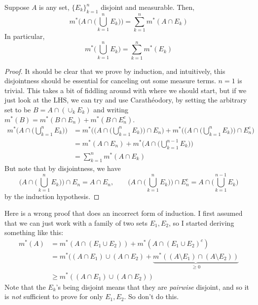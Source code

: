   \begin{lemma}
    Suppose $A$ is any set, $\{E_k\}_{k=1}^n$ disjoint and measurable. Then, 
    \begin{equation}
      m^\ast \bigg( A \cap \Big( \bigcup_{k=1}^n E_k \Big) \bigg) = \sum_{k=1}^n m^\ast (A \cap E_k)
    \end{equation}
    In particular, 
    \begin{equation}
      m^\ast \bigg( \bigcup_{k=1}^n E_k \bigg) = \sum_{k=1}^n m^\ast (E_k)
    \end{equation}
  \end{lemma}
  \begin{proof}
    It should be clear that we prove by induction, and intuitively, this disjointness should be essential for canceling out some measure terms. $n = 1$ is trivial. This takes a bit of fiddling around with where we should start, but if we just look at the LHS, we can try and use Carathéodory, by setting the arbitrary set to be $B = A \cap (\cup_{k} E_k)$ and  writing $m^\ast (B) = m^\ast(B \cap E_n) + m^\ast(B \cap E_n^c)$. 
    \begin{align}
      m^\ast \bigg( A \cap \Big( \bigcup_{k=1}^n E_k \Big) \bigg) 
        & = m^\ast \Bigg( \bigg( A \cap \Big( \bigcup_{k=1}^n E_k \Big) \bigg) \cap E_n \Bigg) + m^\ast \Bigg( \bigg( A \cap \Big( \bigcup_{k=1}^n E_k \Big) \bigg) \cap E_n^c \Bigg) \\  
        & = m^\ast (A \cap E_n) + m^\ast \bigg( A \cap \Big( \bigcup_{k=1}^{n-1} E_k \Big) \bigg) \\ 
        & = \sum_{k=1}^n m^\ast (A \cap E_k)
    \end{align}
    But note that by disjointness, we have 
    \begin{equation}
      \bigg( A \cap \Big( \bigcup_{k=1}^n E_k \Big) \bigg) \cap E_n = A \cap E_n, \qquad \bigg( A \cap \Big( \bigcup_{k=1}^n E_k \Big) \bigg) \cap E_n^c = A \cap \Big( \bigcup_{k=1}^{n-1} E_k \Big)
    \end{equation}
    by the induction hypothesis. 
  \end{proof}

  Here is a wrong proof that does an incorrect form of induction. I first assumed that we can just work with a family of two sets $E_1, E_2$, so I started deriving something like this: 
  \begin{align}
    m^\ast(A) & = m^\ast (A \cap (E_1 \cup E_2)) + m^\ast (A \cap (E_1 \cup E_2)^c ) \\ 
              & = m^\ast ((A \cap E_1) \cup (A \cap E_2) + \underbrace{m^\ast ((A \setminus E_1) \cap (A \setminus E_2))}_{\geq 0} \\ 
              & \geq m^\ast ((A \cap E_1) \cup (A \cap E_2)) 
  \end{align}
  Note that the $E_k$'s being disjoint means that they are \textit{pairwise} disjoint, and so it is \textit{not} sufficient to prove for only $E_1, E_2$. So don't do this. 

